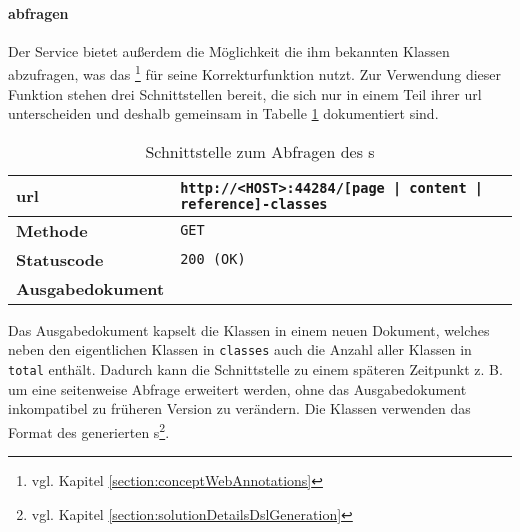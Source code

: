     \paragraph{{\classificationModel} abfragen}
    Der Service bietet außerdem die Möglichkeit die ihm bekannten Klassen abzufragen,
    was das {\annotatorPlugin}\footnote{vgl. Kapitel \ref{section:conceptWebAnnotations}}
    für seine Korrekturfunktion nutzt.
    Zur Verwendung dieser Funktion stehen drei Schnittstellen bereit,
    die sich nur in einem Teil ihrer \gls{url} unterscheiden und deshalb gemeinsam in
    Tabelle \ref{table:getClassesInterface} dokumentiert sind.

    \begin{table}[htb]
        \centering
        \begin{tabular}{|l|l|}
        \hline
        \textbf{\gls{url}} & \texttt{http://<HOST>:44284/[page | content | reference]-classes}\\
        \hline
        \textbf{Methode} & \texttt{GET}\\
        \hline
        \textbf{Statuscode} & \texttt{200 (OK)}\\
        \hline
        \textbf{Ausgabedokument} & \\
        \hline
        \end{tabular}
        \caption{Schnittstelle zum Abfragen des {\classificationModel}s}
        \label{table:getClassesInterface}
    \end{table}

    Das Ausgabedokument kapselt die Klassen in einem neuen Dokument,
    welches neben den eigentlichen Klassen in \texttt{classes}
    auch die Anzahl aller Klassen in \texttt{total} enthält.
    Dadurch kann die Schnittstelle zu einem späteren Zeitpunkt z. B. um eine
    seitenweise Abfrage erweitert werden,
    ohne das Ausgabedokument inkompatibel zu früheren Version zu verändern.
    Die Klassen verwenden das Format des generierten
    {\classificationModel}s\footnote{vgl. Kapitel \ref{section:solutionDetailsDslGeneration}}.

